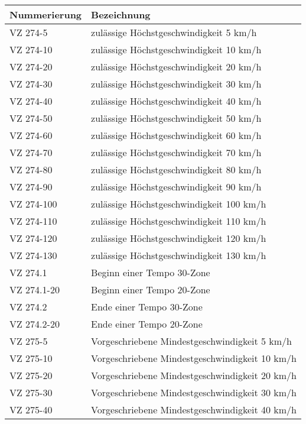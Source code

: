 \begin{appendix}
\begin{longtabu}{l X[j]}
\hline
\bf Nummerierung & \bf Bezeichnung\\
\hline
\gls{VZ}	274-5	&  	zulässige Höchstgeschwindigkeit 5 km/h\\ 
\hline
\gls{VZ}	274-10	& zulässige Höchstgeschwindigkeit 10 km/h\\ \hline
\gls{VZ}	274-20	& zulässige Höchstgeschwindigkeit 20 km/h\\ \hline
\gls{VZ}	274-30	& zulässige Höchstgeschwindigkeit 30 km/h\\ \hline
\gls{VZ}	274-40	& zulässige Höchstgeschwindigkeit 40 km/h\\ \hline
\gls{VZ}	274-50	& zulässige Höchstgeschwindigkeit 50 km/h\\ \hline
\gls{VZ}	274-60	& zulässige Höchstgeschwindigkeit 60 km/h\\ \hline
\gls{VZ}	274-70	& zulässige Höchstgeschwindigkeit 70 km/h\\ \hline
\gls{VZ}	274-80	& zulässige Höchstgeschwindigkeit 80 km/h\\ \hline
\gls{VZ}	274-90	& zulässige Höchstgeschwindigkeit 90 km/h\\ \hline
\gls{VZ}	274-100	& zulässige Höchstgeschwindigkeit 100 km/h\\ \hline
\gls{VZ}	274-110	& zulässige Höchstgeschwindigkeit 110 km/h\\ \hline
\gls{VZ}	274-120	& zulässige Höchstgeschwindigkeit 120 km/h\\ \hline
\gls{VZ}	274-130	& zulässige Höchstgeschwindigkeit 130 km/h\\ \hline
\gls{VZ}	274.1	& Beginn einer Tempo 30-Zone\\ \hline
\gls{VZ}	274.1-20& Beginn einer Tempo 20-Zone\\ \hline
\gls{VZ}	274.2	& Ende einer Tempo 30-Zone\\ \hline
\gls{VZ}	274.2-20& Ende einer Tempo 20-Zone\\ \hline
\gls{VZ}	275-5	& Vorgeschriebene Mindestgeschwindigkeit 5 km/h\\ \hline
\gls{VZ}	275-10	& Vorgeschriebene Mindestgeschwindigkeit 10 km/h\\ \hline
\gls{VZ}	275-20	& Vorgeschriebene Mindestgeschwindigkeit 20 km/h\\ \hline
\gls{VZ}	275-30	& Vorgeschriebene Mindestgeschwindigkeit 30 km/h\\ \hline
\gls{VZ}	275-40	& Vorgeschriebene Mindestgeschwindigkeit 40 km/h\\ \hline

\end{longtabu}
\end{appendix}
